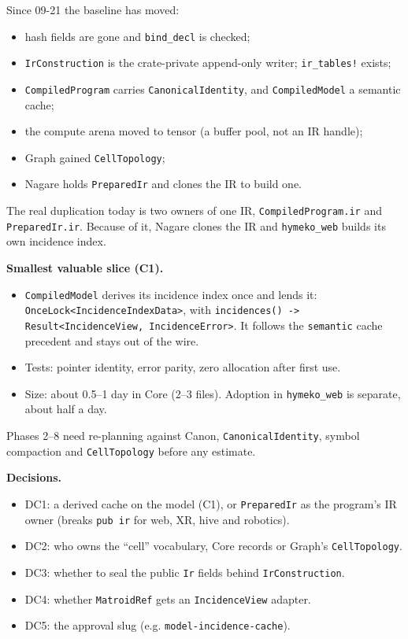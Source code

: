 \documentclass[11pt,a4paper]{article}
\newcommand{\code}[1]{\texttt{#1}}
\begin{document}
Since 09-21 the baseline has moved:
\begin{itemize}[nosep]
\item hash fields are gone and \code{bind\_decl} is checked;
\item \code{IrConstruction} is the crate-private append-only writer; \code{ir\_tables!} exists;
\item \code{CompiledProgram} carries \code{CanonicalIdentity}, and \code{CompiledModel} a semantic cache;
\item the compute arena moved to tensor (a buffer pool, not an IR handle);
\item Graph gained \code{CellTopology};
\item Nagare holds \code{PreparedIr} and clones the IR to build one.
\end{itemize}

The real duplication today is two owners of one IR, \code{CompiledProgram.ir} and \code{PreparedIr.ir}.
Because of it, Nagare clones the IR and \code{hymeko\_web} builds its own incidence index.

\textbf{Smallest valuable slice (C1).}
\begin{itemize}[nosep]
\item \code{CompiledModel} derives its incidence index once and lends it:
  \code{OnceLock<IncidenceIndexData>}, with \code{incidences() -> Result<IncidenceView, IncidenceError>}. It
  follows the \code{semantic} cache precedent and stays out of the wire.
\item Tests: pointer identity, error parity, zero allocation after first use.
\item Size: about 0.5--1 day in Core (2--3 files). Adoption in \code{hymeko\_web} is separate, about half a day.
\end{itemize}

Phases 2--8 need re-planning against Canon, \code{CanonicalIdentity}, symbol compaction and
\code{CellTopology} before any estimate.

\textbf{Decisions.}
\begin{itemize}[nosep]
\item DC1: a derived cache on the model (C1), or \code{PreparedIr} as the program's IR owner (breaks
  \code{pub ir} for web, XR, hive and robotics).
\item DC2: who owns the ``cell'' vocabulary, Core records or Graph's \code{CellTopology}.
\item DC3: whether to seal the public \code{Ir} fields behind \code{IrConstruction}.
\item DC4: whether \code{MatroidRef} gets an \code{IncidenceView} adapter.
\item DC5: the approval slug (e.g. \code{model-incidence-cache}).
\end{itemize}
\end{document}
